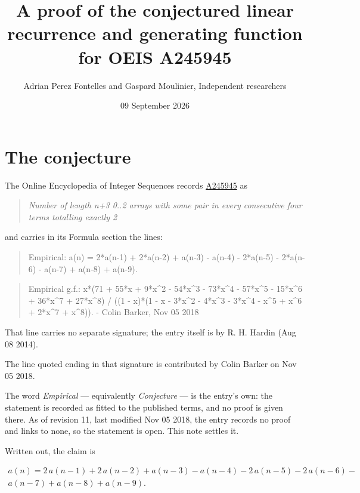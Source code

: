 \documentclass[11pt]{article}
\title{A proof of the conjectured linear recurrence and generating function for OEIS A245945}
\author{Adrian Perez Fontelles and Gaspard Moulinier, Independent researchers}
\date{09 September 2026}
\theoremstyle{definition}
\begin{document}
\maketitle
\section{The conjecture}

The Online Encyclopedia of Integer Sequences records \href{https://oeis.org/A245945}{A245945} as

\begin{quote}\itshape Number of length n+3 0..2 arrays with some pair in every consecutive four terms totalling exactly 2\end{quote}

and carries in its Formula section the lines:

\begin{quote}\ttfamily Empirical: a(n) = 2*a(n-1) + 2*a(n-2) + a(n-3) - a(n-4) - 2*a(n-5) - 2*a(n-6) - a(n-7) + a(n-8) + a(n-9).\end{quote}

\begin{quote}\ttfamily Empirical g.f.: x*(71 + 55*x + 9*x\textasciicircum{}2 - 54*x\textasciicircum{}3 - 73*x\textasciicircum{}4 - 57*x\textasciicircum{}5 - 15*x\textasciicircum{}6 + 36*x\textasciicircum{}7 + 27*x\textasciicircum{}8) / ((1 - x)*(1 - x - 3*x\textasciicircum{}2 - 4*x\textasciicircum{}3 - 3*x\textasciicircum{}4 - x\textasciicircum{}5 + x\textasciicircum{}6 + 2*x\textasciicircum{}7 + x\textasciicircum{}8)). - Colin Barker, Nov 05 2018\end{quote}

That line carries no separate signature; the entry itself is by R. H. Hardin (Aug 08 2014).

The line quoted ending in that signature is contributed by Colin Barker on Nov 05 2018.

The word {\itshape Empirical} --- equivalently {\itshape Conjecture} --- is the entry's own: the statement is recorded as fitted to the published terms, and no proof is given there. As of revision 11, last modified Nov 05 2018, the entry records no proof and links to none, so the statement is open. This note settles it.

Written out, the claim is

\begin{multline*} a(n) = 2\,a(n-1) + 2\,a(n-2) + a(n-3) - a(n-4) - 2\,a(n-5) - 2\,a(n-6) - \\ a(n-7) + a(n-8) + a(n-9). \end{multline*}
\end{document}
